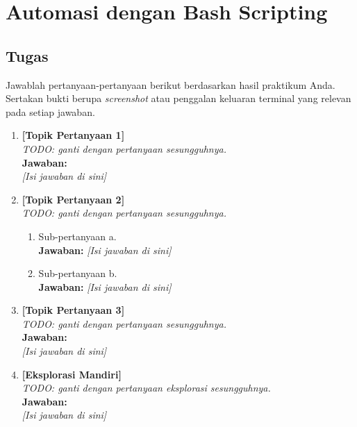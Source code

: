 
\chapter{Automasi dengan Bash Scripting}
\label{chap:handson-02}

\section{Tugas}

Jawablah pertanyaan-pertanyaan berikut berdasarkan hasil praktikum Anda.
Sertakan bukti berupa \textit{screenshot} atau penggalan keluaran terminal
yang relevan pada setiap jawaban.

\begin{enumerate}
    \item \textbf{[Topik Pertanyaan 1]}\\
    \textit{TODO: ganti dengan pertanyaan sesungguhnya.}\\[0.3cm]
    \textbf{Jawaban:}\\
    \textit{[Isi jawaban di sini]}

    \item \textbf{[Topik Pertanyaan 2]}\\
    \textit{TODO: ganti dengan pertanyaan sesungguhnya.}
    \begin{enumerate}
        \item[(a)] Sub-pertanyaan a.\\
        \textbf{Jawaban:} \textit{[Isi jawaban di sini]}
        \item[(b)] Sub-pertanyaan b.\\
        \textbf{Jawaban:} \textit{[Isi jawaban di sini]}
    \end{enumerate}

    \item \textbf{[Topik Pertanyaan 3]}\\
    \textit{TODO: ganti dengan pertanyaan sesungguhnya.}\\[0.3cm]
    \textbf{Jawaban:}\\
    \textit{[Isi jawaban di sini]}

    \item \textbf{[Eksplorasi Mandiri]}\\
    \textit{TODO: ganti dengan pertanyaan eksplorasi sesungguhnya.}\\[0.3cm]
    \textbf{Jawaban:}\\
    \textit{[Isi jawaban di sini]}
\end{enumerate}